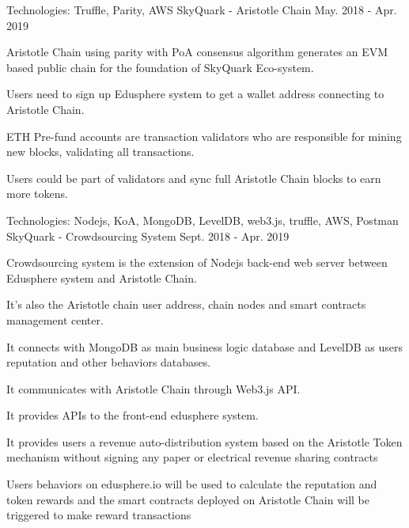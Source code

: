 \begin{cventries}
\cventry
    {Technologies: \quad Truffle, Parity, AWS}
    {SkyQuark - Aristotle Chain}
    {}
    {May. 2018 - Apr. 2019}
    {
      \begin{cvitems}
        \item {Aristotle Chain using parity with PoA consensus algorithm generates an EVM based public chain for the foundation of SkyQuark Eco-system.}
        \item {Users need to sign up Edusphere system to get a wallet address connecting to Aristotle Chain.}
        \item {ETH Pre-fund accounts are transaction validators who are responsible for mining new blocks, validating all transactions.}
        \item {Users could be part of validators and sync full Aristotle Chain blocks to earn more tokens.}
      \end{cvitems}
    }
    
\cventry
    {Technologies: \quad Nodejs, KoA, MongoDB, LevelDB, web3.js, truffle, AWS, Postman
    }
    {SkyQuark - Crowdsourcing System}
    {}
    {Sept. 2018 - Apr. 2019}
    {
      \begin{cvitems}
        \item {Crowdsourcing system is the extension of Nodejs back-end web server between Edusphere system and Aristotle Chain.}
        \item {It's also the Aristotle chain user address, chain nodes and smart contracts   management center.}
        \item {It connects with MongoDB as main business logic database and LevelDB as users reputation and other behaviors databases.}
        \item {It communicates with Aristotle Chain through Web3.js API.}
        \item {It provides APIs to the front-end edusphere system.}
        \item {It provides users a revenue auto-distribution system based on the Aristotle Token mechanism without signing any paper or electrical revenue sharing contracts}
        \item {Users behaviors on edusphere.io will be used to calculate the reputation and token rewards and the smart contracts deployed on Aristotle Chain will be triggered to make reward transactions}
      \end{cvitems}
    }


\end{cventries}
